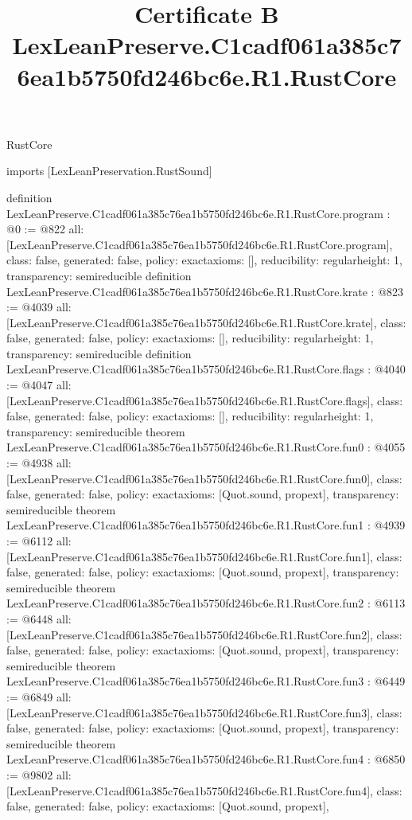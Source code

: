\begin{lexlean}{RustCore}
\title{Certificate B LexLeanPreserve.C1cadf061a385c76ea1b5750fd246bc6e.R1.RustCore}
\begin{coremodule}
imports [LexLeanPreservation.RustSound]

definition LexLeanPreserve.C1cadf061a385c76ea1b5750fd246bc6e.R1.RustCore.program : @0 := @822 {
  all: [LexLeanPreserve.C1cadf061a385c76ea1b5750fd246bc6e.R1.RustCore.program],
  class: false,
  generated: false,
  policy: exact{axioms: []},
  reducibility: regular{height: 1},
  transparency: semireducible
}
definition LexLeanPreserve.C1cadf061a385c76ea1b5750fd246bc6e.R1.RustCore.krate : @823 := @4039 {
  all: [LexLeanPreserve.C1cadf061a385c76ea1b5750fd246bc6e.R1.RustCore.krate],
  class: false,
  generated: false,
  policy: exact{axioms: []},
  reducibility: regular{height: 1},
  transparency: semireducible
}
definition LexLeanPreserve.C1cadf061a385c76ea1b5750fd246bc6e.R1.RustCore.flags : @4040 := @4047 {
  all: [LexLeanPreserve.C1cadf061a385c76ea1b5750fd246bc6e.R1.RustCore.flags],
  class: false,
  generated: false,
  policy: exact{axioms: []},
  reducibility: regular{height: 1},
  transparency: semireducible
}
theorem LexLeanPreserve.C1cadf061a385c76ea1b5750fd246bc6e.R1.RustCore.fun0 : @4055 := @4938 {
  all: [LexLeanPreserve.C1cadf061a385c76ea1b5750fd246bc6e.R1.RustCore.fun0],
  class: false,
  generated: false,
  policy: exact{axioms: [Quot.sound, propext]},
  transparency: semireducible
}
theorem LexLeanPreserve.C1cadf061a385c76ea1b5750fd246bc6e.R1.RustCore.fun1 : @4939 := @6112 {
  all: [LexLeanPreserve.C1cadf061a385c76ea1b5750fd246bc6e.R1.RustCore.fun1],
  class: false,
  generated: false,
  policy: exact{axioms: [Quot.sound, propext]},
  transparency: semireducible
}
theorem LexLeanPreserve.C1cadf061a385c76ea1b5750fd246bc6e.R1.RustCore.fun2 : @6113 := @6448 {
  all: [LexLeanPreserve.C1cadf061a385c76ea1b5750fd246bc6e.R1.RustCore.fun2],
  class: false,
  generated: false,
  policy: exact{axioms: [Quot.sound, propext]},
  transparency: semireducible
}
theorem LexLeanPreserve.C1cadf061a385c76ea1b5750fd246bc6e.R1.RustCore.fun3 : @6449 := @6849 {
  all: [LexLeanPreserve.C1cadf061a385c76ea1b5750fd246bc6e.R1.RustCore.fun3],
  class: false,
  generated: false,
  policy: exact{axioms: [Quot.sound, propext]},
  transparency: semireducible
}
theorem LexLeanPreserve.C1cadf061a385c76ea1b5750fd246bc6e.R1.RustCore.fun4 : @6850 := @9802 {
  all: [LexLeanPreserve.C1cadf061a385c76ea1b5750fd246bc6e.R1.RustCore.fun4],
  class: false,
  generated: false,
  policy: exact{axioms: [Quot.sound, propext]},
}
\end{coremodule}
\end{lexlean}
